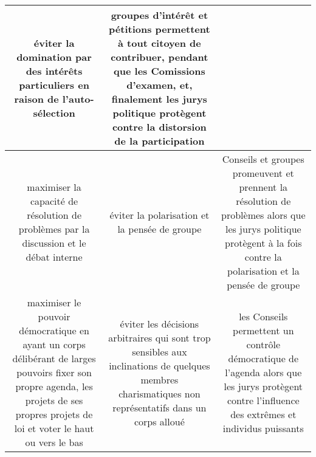 \begin{table}[m]
\begin{tabular}{*{3}{|c}|}
\begin{minipage}[c]{.33\linewidth}
      éviter la domination par des intérêts particuliers en raison de 
      l'auto-sélection
    \end{minipage}
    &
    \begin{minipage}[c]{.33\linewidth}
      groupes d'intérêt et pétitions permettent à
      tout citoyen de contribuer, pendant que les Comissions d'examen,
      et, finalement les jurys politique protègent contre la
      distorsion de la participation
    \end{minipage} 
    \\
    \hline %
    \begin{minipage}[c]{.33\linewidth}
      maximiser la capacité de résolution de problèmes par la discussion
      et le débat interne
    \end{minipage}
    &
    \begin{minipage}[c]{.33\linewidth}
      éviter la polarisation et la pensée de
      groupe
    \end{minipage}
    &
    \begin{minipage}[c]{.33\linewidth}
      Conseils et groupes promeuvent et prennent la résolution de
      problèmes alors que les jurys politique protègent à la fois contre
      la polarisation et la pensée de groupe
    \end{minipage} 
    \\
    \hline %
    \begin{minipage}[c]{.33\linewidth}
      maximiser le pouvoir démocratique en ayant un corps délibérant de
      larges pouvoirs fixer son propre agenda, les projets de ses
      propres projets de loi et voter le haut ou vers le bas 
    \end{minipage}
    &
    \begin{minipage}[c]{.33\linewidth}
      éviter les décisions arbitraires qui sont trop sensibles aux
      inclinations 
      de quelques membres charismatiques non représentatifs dans un
      corps alloué 
    \end{minipage}
    &
    \begin{minipage}[c]{.33\linewidth}
      les Conseils permettent un contrôle démocratique de l'agenda
      alors que les jurys protègent contre l'influence des extrêmes et
      individus puissants 
    \end{minipage} 
    \\
    \hline
  \end{tabular}
  \label{tab1}
\end{table}

